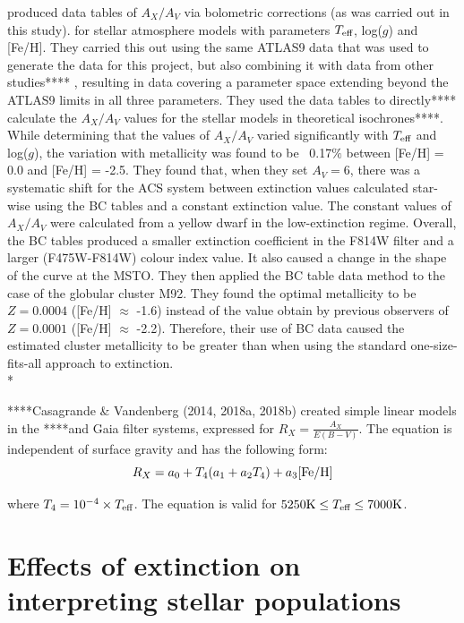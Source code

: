 \documentclass[12pt, a4paper]{report}
\begin{document}
\cite{2008PASP..120..583G} produced data tables of $A_{X}/A_{V}$ via bolometric corrections (as was carried out in this study). for stellar atmosphere models with parameters $T_{\textnormal{eff}}$, log($g$) and [Fe/H]. They carried this out using the same ATLAS9 data \citep{2004astro.ph..5087C} that was used to generate the data for this project, but also combining it with data from other studies**** \cite{2002A&A...391..195G}, resulting in data covering a parameter space extending beyond the ATLAS9 limits in all three parameters. They used the data tables to directly**** calculate the $A_{X}/A_{V}$ values for the stellar models in theoretical isochrones****. While determining that the values of $A_{X}/A_{V}$ varied significantly with $T_{\textnormal{eff}}$ and log($g$), the variation with metallicity was found to be ~0.17$\%$ between [Fe/H] = 0.0 and [Fe/H] = -2.5. They found that, when they set $A_{V} = 6$, there was a systematic shift for the ACS system between extinction values calculated star-wise using the BC tables and a constant extinction value. The constant values of $A_{X}/A_{V}$ were calculated from a yellow dwarf in the low-extinction regime. Overall, the BC tables produced a smaller extinction coefficient in the F814W filter and a larger (F475W-F814W) colour index value. It also caused a change in the shape of the curve at the MSTO. They then applied the BC table data method to the case of the globular cluster M92. They found the optimal metallicity to be $Z = 0.0004$ ([Fe/H] $\approx$ -1.6) instead of the value obtain by previous observers of $Z = 0.0001$ ([Fe/H] $\approx$ -2.2). Therefore, their use of BC data caused the estimated cluster metallicity to be greater than when using the standard one-size-fits-all approach to extinction. \\*

****Casagrande \& Vandenberg (2014, 2018a, 2018b) created simple linear models in the ****and Gaia filter systems, expressed for $R_{X}  = \frac{A_{X}}{E(B-V)}$. The equation is independent of surface gravity and has the following form:
\begin{equation}
R_{X}  = a_{0} + T_{4}(a_{1} + a_{2}T_{4}) + a_{3}\textnormal{[Fe/H]}
\label{casagrande_ext_fit}
\end{equation}

where $T_{4} = 10^{-4} \times T_{\textnormal{eff}}$. The equation is valid for $5250\textnormal{K} \leq T_{\textnormal{eff}} \leq 7000\textnormal{K}$.

\section{Effects of extinction on interpreting stellar populations} \label{extinc_desc}
\end{document}
